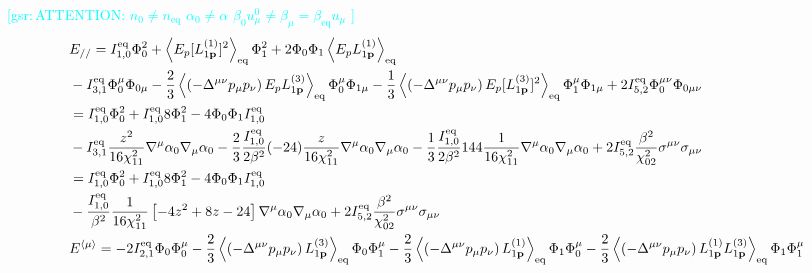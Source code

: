 \documentclass[aps,prd,preprint,nofootinbib,amsmath,amssymb,showpacs,longbibliography,singlecolumn,superscriptaddress,10pt]{revtex4-1}
\theoremstyle{plain}
\theoremstyle{definition}
\newcommand{\gsr}[1]{{\textcolor{cyan}{[gsr:\,{#1}]}}}
\begin{document}
\gsr{ATTENTION: $n_{0} \neq n_{\mathrm{eq}}$ $\alpha_{0} \neq \alpha$ $\beta_{0}u_{\mu}^{0} \neq \beta_{\mu} = \beta_{\mathrm{eq}} u_{\mu}$
}
%
\begin{equation}
\begin{aligned}
&
E_{//} = I_{1,0}^{\mathrm{eq}} \Phi_{0}^{2} 
+
\left\langle E_{p} [L^{(1)}_{1 {\bf p}}]^{2} \right\rangle_{\mathrm{eq}}
\Phi_{1}^{2}
+
2 \Phi_{0} \Phi_{1} \left\langle E_{p} L^{(1)}_{1 {\bf p}} \right\rangle_{\mathrm{eq}} \\
&
-
I_{3,1}^{\mathrm{eq}} \Phi_{0}^{\mu}\Phi_{0 \mu}
-
\frac{2}{3}
\left\langle \left( -\Delta^{\mu \nu} p_{\mu} p_{\nu} \right) E_{p} L^{(3)}_{1 {\bf p}} \right\rangle_{\mathrm{eq}} \Phi_{0}^{\mu}\Phi_{1 \mu}
-
\frac{1}{3}
\left\langle \left( -\Delta^{\mu \nu} p_{\mu} p_{\nu} \right) E_{p} [L^{(3)}_{1 {\bf p}}]^{2} \right\rangle_{\mathrm{eq}} \Phi_{1}^{\mu}\Phi_{1 \mu}
+
2 I_{5,2}^{\mathrm{eq}}
\Phi_{0}^{\mu \nu}\Phi_{0 \mu \nu}
\\
&
=
I_{1,0}^{\mathrm{eq}} \Phi_{0}^{2} 
+
I_{1,0}^{\mathrm{eq}} 8
\Phi_{1}^{2}
-
4 \Phi_{0} \Phi_{1} I_{1,0}^{\mathrm{eq}} 
\\
&
-
I_{3,1}^{\mathrm{eq}} \frac{z^{2}}{16\chi_{11}^{2}}\nabla^{\mu }\alpha_{0} \nabla_{\mu }\alpha_{0}
-
\frac{2}{3}
\frac{I_{1,0}^{\mathrm{eq}}}{2\beta^{2}} (-24) \frac{z}{16\chi_{11}^{2}}\nabla^{\mu }\alpha_{0} \nabla_{\mu }\alpha_{0}
-
\frac{1}{3}
\frac{I_{1,0}^{\mathrm{eq}}}{2\beta^{2}} 144 \frac{1}{16\chi_{11}^{2}}\nabla^{\mu }\alpha_{0} \nabla_{\mu }\alpha_{0}
+
2 I_{5,2}^{\mathrm{eq}}
\frac{\beta^{2}}{\chi_{02}^{2}} 
\sigma^{\mu \nu }\sigma_{\mu \nu }
\\
&
=
I_{1,0}^{\mathrm{eq}} \Phi_{0}^{2} 
+
I_{1,0}^{\mathrm{eq}} 8
\Phi_{1}^{2}
-
4 \Phi_{0} \Phi_{1} I_{1,0}^{\mathrm{eq}} \\
&
-
\frac{I_{1,0}^{\mathrm{eq}}}{\beta^{2}} \frac{1}{16 \chi_{11}^{2}}\left[- 4z^{2} + 8z - 24\right]\nabla^{\mu }\alpha_{0} \nabla_{\mu }\alpha_{0}
+
2 I_{5,2}^{\mathrm{eq}}
\frac{\beta^{2}}{\chi_{02}^{2}} 
\sigma^{\mu \nu }\sigma_{\mu \nu }
\\
&
E^{\langle \mu \rangle}  = - 2 I_{2,1}^{\mathrm{eq}}  \Phi_{0} \Phi_{0}^{\mu}
-
\frac{2}{3}\left\langle \left( -\Delta^{\mu \nu} p_{\mu} p_{\nu} \right) L^{(3)}_{1 {\bf p}} \right\rangle_{\mathrm{eq}}  \Phi_{0} \Phi_{1}^{\mu}
-
\frac{2}{3}\left\langle \left( -\Delta^{\mu \nu} p_{\mu} p_{\nu} \right) L^{(1)}_{1 {\bf p}} \right\rangle_{\mathrm{eq}} \Phi_{1} \Phi_{0}^{\mu}
-
\frac{2}{3}\left\langle \left( -\Delta^{\mu \nu} p_{\mu} p_{\nu} \right) L^{(1)}_{1 {\bf p}} L^{(3)}_{1 {\bf p}} \right\rangle_{\mathrm{eq}}  \Phi_{1} \Phi_{1}^{\mu}

\end{aligned}
\end{equation}
\end{document}
